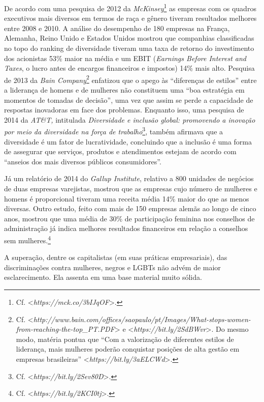 De acordo com uma pesquisa de 2012 da \emph{McKinsey}\footnote{Cf.
  \textless{}\emph{https://mck.co/3bIJqOF}\textgreater{}.} as
empresas com os quadros executivos mais diversos em termos de raça e
gênero tiveram resultados melhores entre 2008 e 2010. A análise do
desempenho de 180 empresas na França, Alemanha, Reino Unido e Estados
Unidos mostrou que companhias classificadas no topo do ranking de
diversidade tiveram uma taxa de retorno do investimento dos acionistas
53\% maior na média e um EBIT (\emph{Earnings Before Interest and
Taxes}, o lucro antes de encargos financeiros e impostos) 14\% mais
alto. Pesquisa de 2013 da \emph{Bain Company}\footnote{Cf.
  \textless{}\emph{http://www.bain.com/offices/saopaulo/pt/Images/What-stops-women-from-reaching-the-top\_PT.PDF}\textgreater{} %
  e
  \textless{}\emph{https://bit.ly/2SdBWvr}\textgreater{}.
  Do mesmo modo, matéria pontua que ``Com a valorização de diferentes
  estilos de liderança, mais mulheres poderão conquistar posições de
  alta gestão em empresas brasileiras''
  \textless{}\emph{https://bit.ly/3aELCWd}\textgreater{}.}
enfatizou que o apego às ``diferenças de estilos'' entre a liderança de
homens e de mulheres não constituem uma ``boa estratégia em momentos de
tomadas de decisão'', uma vez que assim se perde a capacidade de
respostas inovadoras em face dos problemas. Enquanto isso, uma pesquisa
de 2014 da \emph{AT\&T,} intitulada \emph{Diversidade e inclusão global:
promovendo a inovação por meio da diversidade na força de
trabalho}\footnote{Cf.
  \textless{}\emph{https://bit.ly/2Sev80D}\textgreater{}.},
também afirmava que a diversidade é um fator de lucratividade,
concluindo que a inclusão é uma forma de assegurar que serviços,
produtos e atendimentos estejam de acordo com ``anseios dos mais
diversos públicos consumidores''.

Já um relatório de 2014 do \emph{Gallup Institute}, relativo a 800
unidades de negócios de duas empresas varejistas, mostrou que as
empresas cujo número de mulheres e homens é proporcional tiveram uma
receita média 14\% maior do que as menos diversas. Outro estudo, feito
com mais de 150 empresas alemãs ao longo de cinco anos, mostrou que uma
média de 30\% de participação feminina nos conselhos de administração já
indica melhores resultados financeiros em relação a conselhos sem
mulheres.\footnote{Cf.
  \textless{}\emph{https://bit.ly/2KCI0tj}\textgreater{}.}

A superação, dentre os capitalistas (em suas práticas empresariais), das
discriminações contra mulheres, negros e LGBTs não advém de maior
esclarecimento. Ela assenta em uma base material muito sólida.

